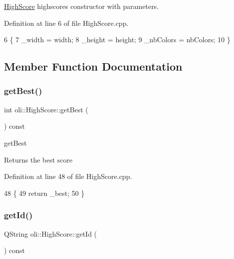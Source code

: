\hyperlink{classoli_1_1_high_score}{High\+Score} highscore\textquotesingle{}s constructor with parameters. 



Definition at line 6 of file High\+Score.\+cpp.


\begin{DoxyCode}
6                                                      \{
7     \_width = width;
8     \_height = height;
9     \_nbColors = nbColors;
10 \}
\end{DoxyCode}


\subsection{Member Function Documentation}
\hypertarget{classoli_1_1_high_score_a22d70136ee71bd13be26e30a423e0e7f}{}\label{classoli_1_1_high_score_a22d70136ee71bd13be26e30a423e0e7f} 
\subsubsection{\texorpdfstring{get\+Best()}{getBest()}}
{\footnotesize\ttfamily int oli\+::\+High\+Score\+::get\+Best (\begin{DoxyParamCaption}{ }\end{DoxyParamCaption}) const}



get\+Best 

\begin{DoxyReturn}{Returns}
the best score 
\end{DoxyReturn}


Definition at line 48 of file High\+Score.\+cpp.


\begin{DoxyCode}
48                             \{
49     \textcolor{keywordflow}{return} \_best;
50 \}
\end{DoxyCode}
\hypertarget{classoli_1_1_high_score_ae0c11fdb5f35199aa785d6e66bfe8d03}{}\label{classoli_1_1_high_score_ae0c11fdb5f35199aa785d6e66bfe8d03} 
\subsubsection{\texorpdfstring{get\+Id()}{getId()}}
{\footnotesize\ttfamily Q\+String oli\+::\+High\+Score\+::get\+Id (\begin{DoxyParamCaption}{ }\end{DoxyParamCaption}) const}



